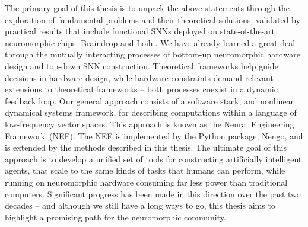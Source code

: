 The primary goal of this thesis is to unpack the above statements through the exploration of fundamental problems and their theoretical solutions, validated by practical results that include functional SNNs deployed on state-of-the-art neuromorphic chips: Braindrop and Loihi.
We have already learned a great deal through the mutually interacting processes of bottom-up neuromorphic hardware design and top-down SNN construction.
Theoretical frameworks help guide decisions in hardware design, while hardware constraints demand relevant extensions to theoretical frameworks -- both processes coexist in a dynamic feedback loop.
Our general approach consists of a software stack, and nonlinear dynamical systems framework,
for describing computations within a language of low-frequency vector spaces.
This approach is known as the Neural Engineering Framework~(NEF).
The NEF is implemented by the Python package, Nengo, and is extended by the methods
described in this thesis.
The ultimate goal of this approach is to develop a unified set of tools for constructing
artificially intelligent agents, that scale to the same kinds of tasks that
humans can perform, while running on neuromorphic hardware consuming far less
power than traditional computers.
Significant progress has been made in this direction over the past two decades -- and although we still
have a long ways to go, this thesis aims to highlight a promising path for the neuromorphic community.

